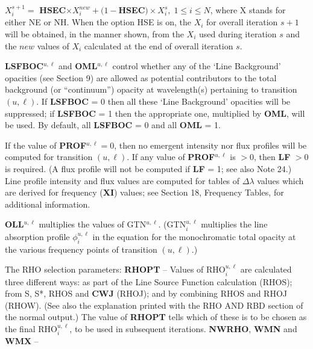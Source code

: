 $X^{s+1}_i = $ {\bf HSEC}$ \times X^{new}_i + (1 - ${\bf HSEC}$) \times X^s_i, 
\; 1 \leq i \leq N$, where X stands for either NE or NH. \np
When the option HSE is on, the $X_i$ for overall iteration $s+1$ will be
obtained, in the manner shown, from the $X_i$ used during iteration $s$
and the $new$ values of $X_i$ calculated at the end of overall iteration $s$.
\blankline
\blankline
\centerline{}
\space \noindent
{\bf LSFBOC}$^{u, \ell}$ and {\bf OML}$^{u, \ell}$ control whether any of the
`Line Background' \break opacities (see Section 9) are allowed as potential 
contributors to the total background (or ``continuum'') opacity at wavelength(s)
pertaining to transition $(u, \ell)$. \break If {\bf LSFBOC} = 0 then all these
`Line Background' opacities will be suppressed; \break if {\bf LSFBOC} = 1 then
the appropriate one, multiplied by {\bf OML}, will be used. \np
By default, all {\bf LSFBOC} = 0 and all {\bf OML} = 1.
\blankline
\blankline
\centerline{}
\space \noindent
If the value of {\bf PROF}$^{u,\ell} = 0$, then no emergent intensity nor flux
profiles will be computed for transition $(u,\ell)$. If any value of
{\bf PROF}$^{u,\ell}$ is $> 0$, then {\bf LF} $> 0$ is required. (A flux profile
will not be computed if {\bf LF} = 1; see also Note 24.) \np
Line profile intensity and flux values are computed for tables of
$\Delta \lambda$ values which are derived for frequency ({\bf XI}) values;
see Section 18, Frequency Tables, for additional information.
\blankline
\blankline
\centerline{}
\space \noindent
{\bf OLL}$^{u, \ell}$ multiplies the values of GTN$^{u, \ell}$.
(GTN$^{u, \ell}_i$ multiplies the line absorption profile $\phi^{u, \ell}
_i$ in the equation for the monochromatic total opacity at the various
frequency points of transition $(u, \ell)$.)
\ej
\centerline{}
\space \noindent
The RHO selection parameters: \np
{\bf RHOPT} -- \np
Values of RHO$^{u,\ell}_i$ are calculated three different ways:
\bull as part of the Line Source Function calculation (RHOS);
\bull from S, S*, RHOS and {\bf CWJ} (RHOJ); and
\bull by combining RHOS and RHOJ (RHOW). 
(See also the explanation printed with the RHO AND RBD section of the
normal output.) 
The value of {\bf RHOPT} tells which of these is to be
chosen as the final RHO$^{u,\ell}_i$, to be used in subsequent iterations.
\spice \noindent
{\bf NWRHO}, {\bf WMN} and {\bf WMX} -- \np
